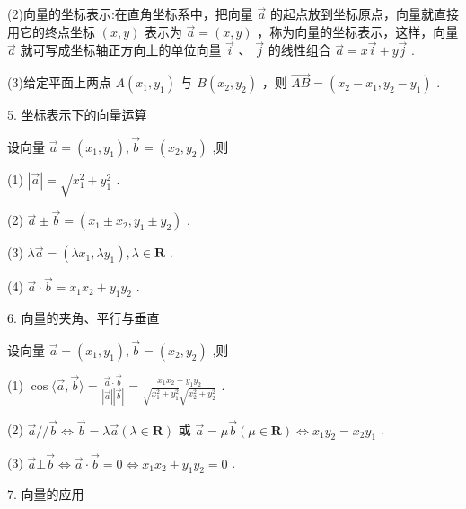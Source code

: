 \documentclass[10pt]{article}
\begin{document}
(2)向量的坐标表示:在直角坐标系中，把向量 \(\overrightarrow{a}\) 的起点放到坐标原点，向量就直接用它的终点坐标 \(\left( {x,y}\right)\) 表示为 \(\overrightarrow{a} = \left( {x,y}\right)\) ，称为向量的坐标表示，这样，向量 \(\overrightarrow{a}\) 就可写成坐标轴正方向上的单位向量 \(\overrightarrow{i}\text{ 、 }\overrightarrow{j}\) 的线性组合 \(\overrightarrow{a} = x\overrightarrow{i} + y\overrightarrow{j}\) .

(3)给定平面上两点 \(A\left( {{x}_{1},{y}_{1}}\right)\) 与 \(B\left( {{x}_{2},{y}_{2}}\right)\) ，则 \(\overrightarrow{AB} = \left( {{x}_{2} - {x}_{1},{y}_{2} - {y}_{1}}\right)\) .

5. 坐标表示下的向量运算

设向量 \(\overrightarrow{a} = \left( {{x}_{1},{y}_{1}}\right) ,\overrightarrow{b} = \left( {{x}_{2},{y}_{2}}\right)\) ,则

(1) \(\left| \overrightarrow{a}\right|  = \sqrt{{x}_{1}^{2} + {y}_{1}^{2}}\) .

(2) \(\overrightarrow{a} \pm  \overrightarrow{b} = \left( {{x}_{1} \pm  {x}_{2},{y}_{1} \pm  {y}_{2}}\right)\) .

(3) \(\lambda \overrightarrow{a} = \left( {\lambda {x}_{1},\lambda {y}_{1}}\right) ,\lambda  \in  \mathbf{R}\) .

(4) \(\overrightarrow{a} \cdot  \overrightarrow{b} = {x}_{1}{x}_{2} + {y}_{1}{y}_{2}\) .

6. 向量的夹角、平行与垂直

设向量 \(\overrightarrow{a} = \left( {{x}_{1},{y}_{1}}\right) ,\overrightarrow{b} = \left( {{x}_{2},{y}_{2}}\right)\) ,则

(1) \(\cos \langle \overrightarrow{a},\overrightarrow{b}\rangle  = \frac{\overrightarrow{a} \cdot  \overrightarrow{b}}{\left| \overrightarrow{a}\right| \left| \overrightarrow{b}\right| } = \frac{{x}_{1}{x}_{2} + {y}_{1}{y}_{2}}{\sqrt{{x}_{1}^{2} + {y}_{1}^{2}}\sqrt{{x}_{2}^{2} + {y}_{2}^{2}}}\) .

(2) \(\overrightarrow{a}//\overrightarrow{b} \Leftrightarrow  \overrightarrow{b} = \lambda \overrightarrow{a}\left( {\lambda  \in  \mathbf{R}}\right)\) 或 \(\overrightarrow{a} = \mu \overrightarrow{b}\left( {\mu  \in  \mathbf{R}}\right)  \Leftrightarrow  {x}_{1}{y}_{2} = {x}_{2}{y}_{1}\) .

(3) \(\overrightarrow{a}\bot \overrightarrow{b} \Leftrightarrow  \overrightarrow{a} \cdot  \overrightarrow{b} = 0 \Leftrightarrow  {x}_{1}{x}_{2} + {y}_{1}{y}_{2} = 0\) .

7. 向量的应用
\end{document}
